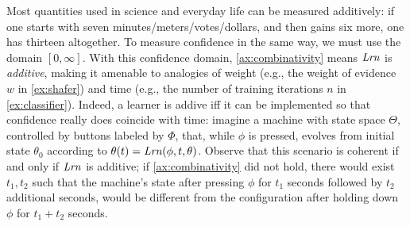 Most quantities 
used in science and everyday life
can be measured additively:
if one starts with seven minutes/meters/votes/dollars,
and then gains six
more,
one has thirteen altogether.
To measure confidence in the same way, we must use the domain $[0,\infty]$. 
With this confidence domain, \cref{ax:combinativity} means $\mathit{Lrn}$ is \emph{additive},
making it amenable to analogies of weight (e.g., the weight of evidence $w$ in \cref{ex:shafer})
and time (e.g., the number of training iterations $n$ in \cref{ex:classifier}).
Indeed, a learner is addive iff it can be implemented so that confidence really does coincide with time: imagine a machine with state space $\Theta$, controlled by buttons labeled by $\Phi$, that, while $\phi$ is pressed, evolves from initial state $\theta_0$ according to $\theta(t) = \mathit{Lrn}(\phi, t, \theta)$. 
Observe that this scenario is coherent if and only if $\mathit{Lrn}$ is additive; if \cref{ax:combinativity} did not hold, there would exist $t_1,t_2$ such that the machine's state after pressing $\phi$ for $t_1$ seconds followed by $t_2$ additional seconds, would be different from the configuration after holding down $\phi$ for $t_1+t_2$ seconds.

